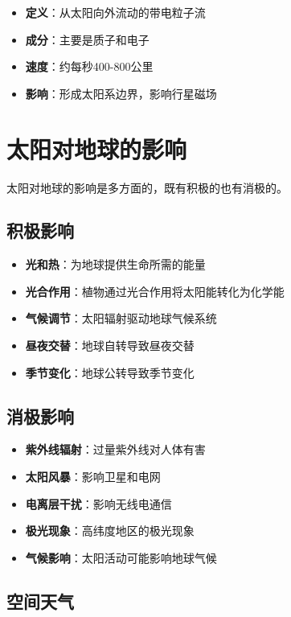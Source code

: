 \documentclass[12pt,UTF8]{ctexbook}
\begin{document}
\begin{itemize}
  \item \textbf{定义}：从太阳向外流动的带电粒子流
  \item \textbf{成分}：主要是质子和电子
  \item \textbf{速度}：约每秒400-800公里
  \item \textbf{影响}：形成太阳系边界，影响行星磁场
\end{itemize}

\section{太阳对地球的影响}

太阳对地球的影响是多方面的，既有积极的也有消极的。

\subsection{积极影响}

\begin{itemize}
  \item \textbf{光和热}：为地球提供生命所需的能量
  \item \textbf{光合作用}：植物通过光合作用将太阳能转化为化学能
  \item \textbf{气候调节}：太阳辐射驱动地球气候系统
  \item \textbf{昼夜交替}：地球自转导致昼夜交替
  \item \textbf{季节变化}：地球公转导致季节变化
\end{itemize}

\subsection{消极影响}

\begin{itemize}
  \item \textbf{紫外线辐射}：过量紫外线对人体有害
  \item \textbf{太阳风暴}：影响卫星和电网
  \item \textbf{电离层干扰}：影响无线电通信
  \item \textbf{极光现象}：高纬度地区的极光现象
  \item \textbf{气候影响}：太阳活动可能影响地球气候
\end{itemize}

\subsection{空间天气}
\end{document}
